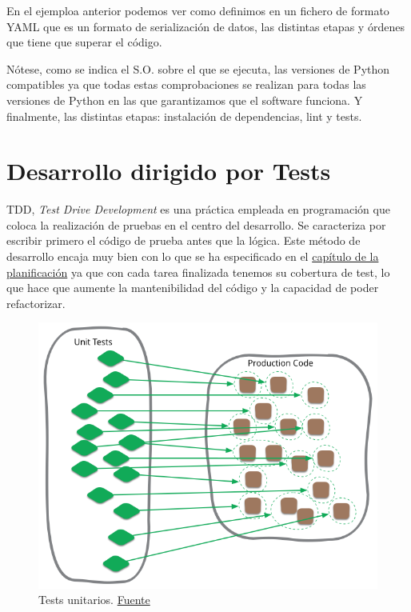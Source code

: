 En el ejemploa anterior podemos ver como definimos en un fichero de formato YAML que es un formato de serialización de datos, las distintas etapas y órdenes que tiene que superar el código.

Nótese, como se indica el S.O. sobre el que se ejecuta, las versiones de Python compatibles ya que todas estas comprobaciones se realizan para todas las versiones de Python en las que garantizamos que el software funciona. Y finalmente, las distintas etapas: instalación de dependencias, lint y tests.

\section{Desarrollo dirigido por Tests}
TDD, \textit{Test Drive Development} es una práctica empleada en programación que coloca la realización de pruebas en el centro del desarrollo. Se caracteriza por escribir primero el código de prueba antes que la lógica. Este método de desarrollo encaja muy bien con lo que se ha especificado en el \hyperref[sec:planificacion]{capítulo de la planificación} ya que con cada tarea finalizada tenemos su cobertura de test, lo que hace que aumente la mantenibilidad del código y la capacidad de poder refactorizar.


\FloatBarrier
\begin{figure}[h]
	\centering	
	\includegraphics[width=\textwidth]{doc/logos/imgs/unit-test.png}
    \caption{ Tests unitarios. \href{https://martinfowler.com/bliki/images/unitTest/sketch.png}{Fuente}}
    \label{fig:unit-tests}
\end{figure}
\FloatBarrier

